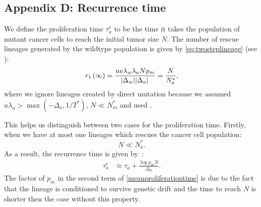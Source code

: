 \documentclass[12pt]{extarticle}
\begin{document}
\begin{appendices}
\section*{Appendix D: Recurrence time}
We define the proliferation time $\tau_a^r$  to be the time it takes the population of mutant cancer cells to reach the initial tumor size $N$. The number of rescue lineages generated by the wildtype population is given by  \cref{eq:twosteplineage} (see ):
\begin{equation*}
r_1\left(\infty\right)=\frac{uv\lambda_w\lambda_aNp_m}{\abs{\Delta_w}\abs{\Delta_a}}=\frac{N}{N_a^*},
\end{equation*}
where we ignore lineages created by direct mutation because we assumed $u\lambda_a > \max{(-\Delta_a, 1/T^*)}$, $N\ll N_m^*$ and used .

This helps us distinguish between two cases for the proliferation time. Firstly, when we have at most one lineages which rescues the cancer cell population:
\begin{equation*}
N\ll N_a^*.
\end{equation*}
As a result, the recurrence time is given by~\citep{avanzini2019cancer}:
\begin{align}\label{meanproliferationtime}
\tau_a^r&\approx\tau_a+\frac{\log p_mN}{\Delta_m}.
\end{align}
The factor of $p_m$ in the second term of \cref{meanproliferationtime} is due to the fact that the lineage is conditioned to survive genetic drift and the time to reach $N$ is shorter then the case without this property. 


\end{appendices}
\end{document}
